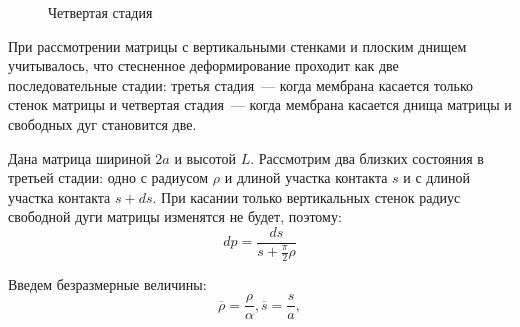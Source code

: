 \begin{figure}[h!]
\begin{minipage}[h]{0.48\linewidth}
				\def\svgwidth{\columnwidth}
                \caption{ Четвертая стадия }
				\label{vert_matrix_pic2}		
		\end{minipage}
		
	\end{figure}
	При рассмотрении матрицы с вертикальными стенками и плоским днищем учитывалось, 
	что стесненное деформирование проходит как две последовательные стадии: 
	третья стадия~--- когда мембрана касается только стенок матрицы и четвертая 
	стадия~--- когда мембрана касается днища матрицы и свободных дуг становится две.
	
	
	Дана матрица шириной $2a$ и высотой $L$.
	Рассмотрим два близких состояния в третьей стадии:
	одно  с радиусом $\rho$ и длиной участка контакта $s$ и с длиной участка контакта $s+ds$. При касании только вертикальных стенок радиус свободной дуги матрицы изменятся не будет, поэтому: 
\begin{equation}
dp = \dfrac{ds}{s+\frac{\pi}{2}\rho}
\label{vertikal_matrix_trird}
\end{equation}

Введем безразмерные величины:
\begin{equation}
\overline{\rho} = \dfrac{\rho}{\alpha}, \overline{s}=\dfrac{s}{a},
\label{parall_variables_no_dimention}
\end{equation}

